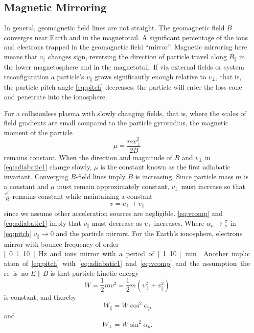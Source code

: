 \FloatBarrier
\subsection{Magnetic Mirroring}\label{sec:mirror}
In general, geomagnetic field lines are not straight. 
The geomagnetic field $B$ converges near Earth and in the magnetotail. 
A significant percentage of the ions and electrons trapped in the geomagnetic field ``mirror''.
Magnetic mirroring here means that $v_\parallel$ changes sign, reversing the direction of particle travel along $B_\parallel$ in the lower magnetosphere and in the magnetotail. 
If via external fields or system reconfiguration a particle's $v_\parallel$ grows significantly enough relative to $v_\perp$, that is, the particle pitch angle \eqref{eq:pitch} decreases, the particle will enter the loss cone and penetrate into the ionosphere.

For a collisionless plasma with slowly changing fields, that is, where the scales of field gradients are small compared to the particle gyroradius, the magnetic moment of the particle \citep{kivelson,chenbook}
\begin{equation}\label{eq:adiabatic1}
\mu = \frac{ m v^2_\perp}{2B}
\end{equation}
remains constant.
When the direction and magnitude of $B$ and $v_\perp$ in \eqref{eq:adiabatic1} change slowly, $\mu$ is the constant known as the first adiabatic invariant. 
Converging $B$-field lines imply $B$ is increasing. 
Since particle mass $m$ is a constant and $\mu$ must remain approximately constant, $v_\perp$ must increase so that $\frac{v^2_\perp}{B}$ remains constant while maintaining a constant
\begin{equation}\label{eq:vcomp}
v = v_\perp + v_\parallel
\end{equation}
since we assume other acceleration sources are negligible.
\eqref{eq:vcomp} and \eqref{eq:adiabatic1} imply that $v_\parallel$ must decrease as $v_\perp$ increases.
Where $\alpha_p \rightarrow \frac{\pi}{2}$ in \eqref{eq:pitch} $v_\parallel \rightarrow 0 $ and the particle mirrors.
For the Earth's ionosphere, electrons mirror with bounce frequency of order \unit[0.1..10]{Hz} and ions mirror with a period of \unit[1..10]{min} \citep{kivelson,newell2009}.
Another implication of \eqref{eq:pitch} with \eqref{eq:adiabatic1} and \eqref{eq:vcomp} and the assumption there is no $E \parallel B$ is that particle kinetic energy
\begin{equation}
W = \frac{1}{2} m v^2 = \frac{1}{2} m \left(v^2_\perp + v^2_\parallel\right)
\end{equation}
is constant, and thereby
\begin{equation}
W_\parallel = W \cos^2 \alpha_p
\end{equation}
and 
\begin{equation}
W_\perp = W \sin^2 \alpha_p.
\end{equation}


